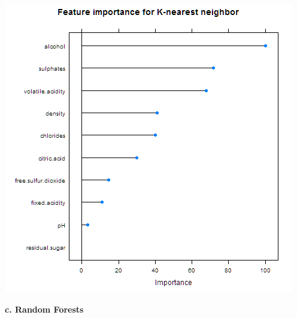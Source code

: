 \documentclass{article}
\begin{document}
\includegraphics[scale=0.9]{2015-12-03-importance-knn}
    

    

    \textbf{c. Random Forests }
\end{document}
